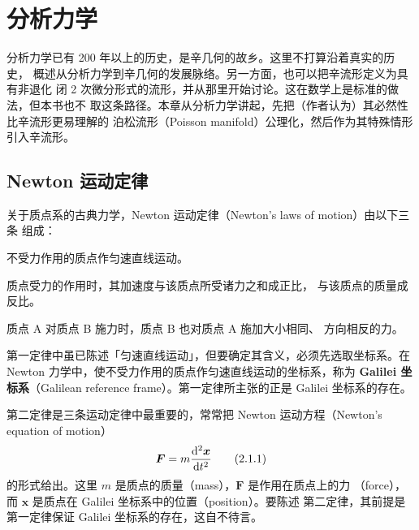 \chapter{分析力学}
分析力学已有 200 年以上的历史，是辛几何的故乡。这里不打算沿着真实的历史，
概述从分析力学到辛几何的发展脉络。另一方面，也可以把辛流形定义为具有非退化
闭 2 次微分形式的流形，并从那里开始讨论。这在数学上是标准的做法，但本书也不
取这条路径。本章从分析力学讲起，先把（作者认为）其必然性比辛流形更易理解的
泊松流形（Poisson manifold）公理化，然后作为其特殊情形引入辛流形。

\section{Newton 运动定律}

关于质点系的古典力学，Newton 运动定律（Newton's laws of motion）由以下三条
组成：

\begin{description}[leftmargin=7em, labelwidth=6.3em, labelsep=0.7em, itemsep=2pt]
\item[\textbf{第一定律}] 不受力作用的质点作匀速直线运动。
\item[\textbf{第二定律}] 质点受力的作用时，其加速度与该质点所受诸力之和成正比，
  与该质点的质量成反比。
\item[\textbf{第三定律}] 质点 A 对质点 B 施力时，质点 B 也对质点 A 施加大小相同、
  方向相反的力。
\end{description}

第一定律中虽已陈述「匀速直线运动」，但要确定其含义，必须先选取坐标系。在
Newton 力学中，使不受力作用的质点作匀速直线运动的坐标系，称为 \textbf{Galilei
坐标系}（Galilean reference frame）。第一定律所主张的正是 Galilei 坐标系的存在。


第二定律是三条运动定律中最重要的，常常把 Newton 运动方程（Newton's equation
of motion）
\begin{equation}
  \bm{F} = m\frac{\mathrm{d}^2\bm{x}}{\mathrm{d} t^2}
  \tag{2.1.1}
\end{equation}
的形式给出。这里 $m$ 是质点的质量（mass），$\bm{F}$ 是作用在质点上的力
（force），而 $\bm{x}$ 是质点在 Galilei 坐标系中的位置（position）。要陈述
第二定律，其前提是第一定律保证 Galilei 坐标系的存在，这自不待言。

